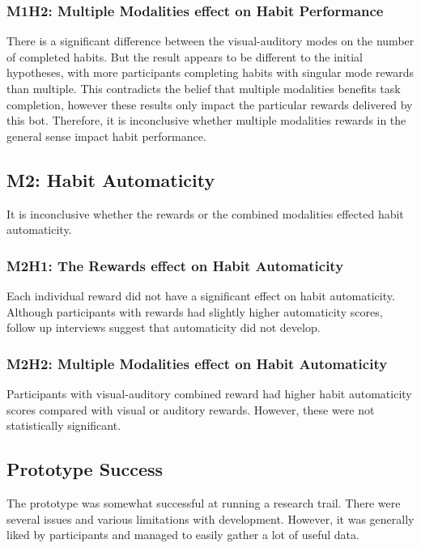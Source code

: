 \subsubsection*{M1H2: Multiple Modalities effect on Habit Performance}
There is a significant difference between the visual-auditory modes on the number of completed habits. But the result appears to be different to the initial hypotheses, with more participants completing habits with singular mode rewards than multiple. This contradicts the belief that multiple modalities benefits task completion, however these results only impact the particular rewards delivered by this bot. Therefore, it is inconclusive whether multiple modalities rewards in the general sense impact habit performance.


\subsection*{M2: Habit Automaticity}
It is inconclusive whether the rewards or the combined modalities effected habit automaticity.

\subsubsection*{M2H1: The Rewards effect on Habit Automaticity}
Each individual reward did not have a significant effect on habit automaticity. Although participants with rewards had slightly higher automaticity scores, follow up interviews suggest that automaticity did not develop.

\subsubsection*{M2H2: Multiple Modalities effect on Habit Automaticity}
Participants with visual-auditory combined reward had higher habit automaticity scores compared with visual or auditory rewards. However, these were not statistically significant.



\subsection{Prototype Success}
The prototype was somewhat successful at running a research trail. There were several issues and various limitations with development. However, it was generally liked by participants and managed to easily gather a lot of useful data.

